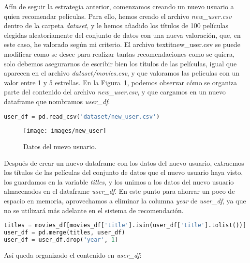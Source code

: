 \documentclass{uimppracticas}
\begin{document}
Afín de seguir la estrategia anterior, comenzamos creando un nuevo usuario a quien recomendar películas. Para ello, hemos creado el archivo \textit{new\_user.csv} dentro de la carpeta \textit{dataset}, y le hemos añadido los títulos de 100 películas elegidas aleatoriamente del conjunto de datos con una nueva valoración, que, en este caso, he valorado según mi criterio. El archivo textit{new\_user.csv} se puede modificar como se desee para realizar tantas recomendaciones como se quiera, solo debemos asegurarnos de escribir bien los títulos de las películas, igual que aparecen en el archivo \textit{dataset/movies.csv}, y que valoramos las películas con un valor entre 1 y 5 estrellas. En la Figura~\ref{new_user}, podemos observar cómo se organiza parte del contenido del archivo \textit{new\_user.csv}, y que cargamos en un nuevo dataframe que nombramos \textit{user\_df}.

\begin{lstlisting}[language=python, basicstyle=\footnotesize, belowskip=-0.5 \baselineskip]
user_df = pd.read_csv('dataset/new_user.csv')
\end{lstlisting}

\begin{figure}[H]
	\centering
	\texttt{[image: images/new\_user]}
	\caption{Datos del nuevo usuario.}
	\label{new_user}
\end{figure}

Después de crear un nuevo dataframe con los datos del nuevo usuario, extraemos los títulos de las películas del conjunto de datos que el nuevo usuario haya visto, los guardamos en la variable \textit{titles}, y los unimos a los datos del nuevo usuario almacenados en el dataframe \textit{user\_df}. En este punto para ahorrar un poco de espacio en memoria, aprovechamos a eliminar la columna \textit{year} de \textit{user\_df}, ya que no se utilizará más adelante en el sistema de recomendación.

\begin{lstlisting}[language=python, basicstyle=\footnotesize, belowskip=-0.5 \baselineskip]
titles = movies_df[movies_df['title'].isin(user_df['title'].tolist())]
user_df = pd.merge(titles, user_df)
user_df = user_df.drop('year', 1)
\end{lstlisting}

Así queda organizado el contenido en \textit{user\_df}:
\end{document}
